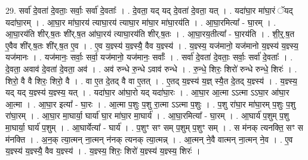 \documentclass[17pt]{extarticle}
\begin{document}
29. सर्वा॑ दे॒वता॑ दे॒वताः॒ सर्वाः॒ सर्वा॑ दे॒वताः᳚ । . दे॒वता॒ यद् यद् दे॒वता॑ दे॒वता॒ यत् । . यदा॑घा॒र मा॑घा॒रं ॅयद् यदा॑घा॒रम् । . आ॒घा॒र मा॑घा॒रय॑ त्याघा॒रय॑ त्याघा॒र मा॑घा॒र मा॑घा॒रय॑ति । . आ॒घा॒रमित्या᳚ - घा॒रम् । . आ॒घा॒रय॑ति शीर्.ष॒तः शी॑र्.ष॒त आ॑घा॒रय॑ त्याघा॒रय॑ति शीर्.ष॒तः । . आ॒घा॒रय॒तीत्या᳚ - घा॒रय॑ति । . शी॒र्॒.ष॒त ए॒वैव शी॑र्.ष॒तः शी॑र्.ष॒त ए॒व । . ए॒व य॒ज्ञ्स्य॑ य॒ज्ञ्स्यै॒ वैव य॒ज्ञ्स्य॑ । . य॒ज्ञ्स्य॒ यज॑मानो॒ यज॑मानो य॒ज्ञ्स्य॑ य॒ज्ञ्स्य॒ यज॑मानः । . यज॑मानः॒ सर्वाः॒ सर्वा॒ यज॑मानो॒ यज॑मानः॒ सर्वाः᳚ । . सर्वा॑ दे॒वता॑ दे॒वताः॒ सर्वाः॒ सर्वा॑ दे॒वताः᳚ । . दे॒वता॒ अवाव॑ दे॒वता॑ दे॒वता॒ अव॑ । . अव॑ रुन्धे रु॒न्धे ऽवाव॑ रुन्धे । . रु॒न्धे॒ शिरः॒ शिरो॑ रुन्धे रुन्धे॒ शिरः॑ । . शिरो॒ वै वै शिरः॒ शिरो॒ वै । . वा ए॒त दे॒तद् वै वा ए॒तत् । . ए॒तद् य॒ज्ञ्स्य॑ य॒ज्ञ् स्यै॒त दे॒तद् य॒ज्ञ्स्य॑ । . य॒ज्ञ्स्य॒ यद् यद् य॒ज्ञ्स्य॑ य॒ज्ञ्स्य॒ यत् । . यदा॑घा॒र आ॑घा॒रो यद् यदा॑घा॒रः । . आ॒घा॒र आ॒त्मा ऽऽत्मा ऽऽघा॒र आ॑घा॒र आ॒त्मा । . आ॒घा॒र इत्या᳚ - घा॒रः । . आ॒त्मा प॒शुः प॒शु रा॒त्मा ऽऽत्मा प॒शुः । . प॒शु रा॑घा॒र मा॑घा॒रम् प॒शुः प॒शु रा॑घा॒रम् । . आ॒घा॒र मा॒घार्या॒ घार्या॑ घा॒र मा॑घा॒र मा॒घार्य॑ । . आ॒घा॒रमित्या᳚ - घा॒रम् । . आ॒घार्य॑ प॒शुम् प॒शु मा॒घार्या॒ घार्य॑ प॒शुम् । . आ॒घार्येत्या᳚ - घार्य॑ । . प॒शुꣳ सꣳ सम् प॒शुम् प॒शुꣳ सम् । . स म॑नक् त्यनक्ति॒ सꣳ स म॑नक्ति । . अ॒न॒क् त्या॒त्मन् ना॒त्मन् न॑नक् त्यनक् त्या॒त्मन्न् । . आ॒त्मन् ने॒वै वात्मन् ना॒त्मन् ने॒व । . ए॒व य॒ज्ञ्स्य॑ य॒ज्ञ्स्यै॒ वैव य॒ज्ञ्स्य॑ । . य॒ज्ञ्स्य॒ शिरः॒ शिरो॑ य॒ज्ञ्स्य॑ य॒ज्ञ्स्य॒ शिरः॑ । \newline
\end{document}
